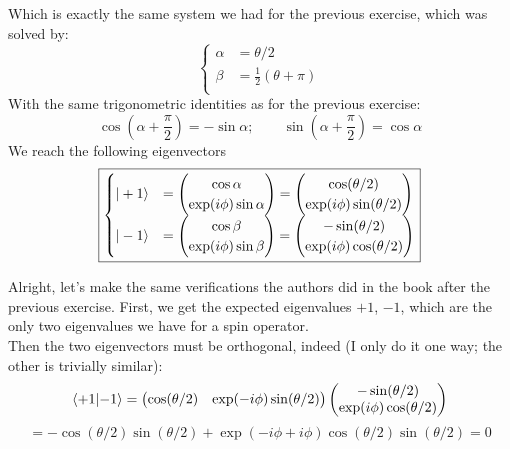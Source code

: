 \documentclass[solutions.tex]{subfiles}
\begin{document}
Which is exactly the same system we had for the previous exercise,
which was solved by:
\[
	\begin{cases}
		\alpha &= \theta/2 \\
		\beta &= \frac12(\theta+\pi) \\
	\end{cases}
\]
With the same trigonometric identities as for the previous exercise:
\[
	\cos(\alpha+\frac\pi2) = -\sin\alpha;\qquad
	\sin(\alpha+\frac\pi2) = \cos\alpha
\]
We reach the following eigenvectors
\[
	\boxed{\begin{cases}
		|+1\rangle &= \begin{pmatrix}
				\cos\alpha \\
				\exp(i\phi)\sin\alpha \\
			\end{pmatrix} = \begin{pmatrix}
				\cos(\theta/2) \\
				\exp(i\phi)\sin(\theta/2) \\
			\end{pmatrix} \\
		|-1\rangle &= \begin{pmatrix}
				\cos\beta \\
				\exp(i\phi)\sin\beta \\
			\end{pmatrix} = \begin{pmatrix}
				-\sin(\theta/2) \\
				\exp(i\phi)\cos(\theta/2) \\
			\end{pmatrix}
	\end{cases}}
\]

\hrr

Alright, let's make the same verifications the authors did in the
book after the previous exercise. First, we get the expected eigenvalues
$+1$, $-1$, which are the only two eigenvalues we have for a spin
operator. \\

Then the two eigenvectors must be orthogonal, indeed (I only do it
one way; the other is trivially similar):
\[
	\left\langle +1 \middle| -1 \right\rangle = \begin{pmatrix}
		\cos(\theta/2) & \exp(-i\phi)\sin(\theta/2) \\
	\end{pmatrix}\begin{pmatrix}
		-\sin(\theta/2) \\
		\exp(i\phi)\cos(\theta/2) \\
	\end{pmatrix}
\]
\[
	= -\cos(\theta/2)\sin(\theta/2) +
		\exp(-i\phi+i\phi)\cos(\theta/2)\sin(\theta/2) = 0
\]
\end{document}
